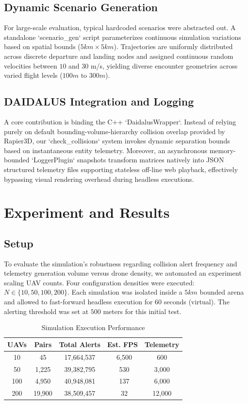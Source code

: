 \documentclass[conference]{IEEEtran}
\begin{document}
\subsection{Dynamic Scenario Generation}
For large-scale evaluation, typical hardcoded scenarios were abstracted out. A standalone `scenario\_gen` script parameterizes continuous simulation variations based on spatial bounds ($5km \times 5km$). Trajectories are uniformly distributed across discrete departure and landing nodes and assigned continuous random velocities between $10$ and $30$ m/s, yielding diverse encounter geometries across varied flight levels ($100m$ to $300m$).

\subsection{DAIDALUS Integration and Logging}
A core contribution is binding the C++ `DaidalusWrapper`. Instead of relying purely on default bounding-volume-hierarchy collision overlap provided by Rapier3D, our `check\_collisions` system invokes dynamic separation bounds based on instantaneous entity telemetry. Moreover, an asynchronous memory-bounded `LoggerPlugin` snapshots transform matrices natively into JSON structured telemetry files supporting stateless off-line web playback, effectively bypassing visual rendering overhead during headless executions.

\section{Experiment and Results}

\subsection{Setup}
To evaluate the simulation's robustness regarding collision alert frequency and telemetry generation volume versus drone density, we automated an experiment scaling UAV counts. Four configuration densities were executed: $N \in \{10, 50, 100, 200\}$. Each simulation was isolated inside a $5km$ bounded arena and allowed to fast-forward headless execution for 60 seconds (virtual). The alerting threshold was set at $500$ meters for this initial test.

\begin{table}[htbp]
\caption{Simulation Execution Performance}
\begin{center}
\begin{tabular}{|c|c|c|c|c|}
\hline
\textbf{UAVs} & \textbf{Pairs} & \textbf{Total Alerts} & \textbf{Est. FPS} & \textbf{Telemetry} \\
\hline
10 & 45 & 17,664,537 & ~6,500 & 600 \\
50 & 1,225 & 39,382,795 & ~530 & 3,000 \\
100 & 4,950 & 40,948,081 & ~137 & 6,000 \\
200 & 19,900 & 38,509,457 & ~32 & 12,000 \\
\hline
\end{tabular}
\label{tab1}
\end{center}
\end{table}
\end{document}
